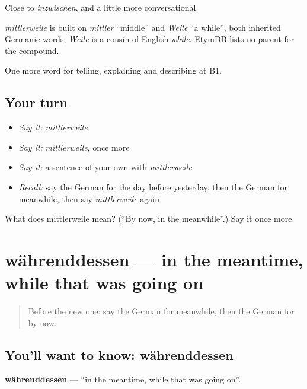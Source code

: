 Close to \emph{inzwischen}, and a little more conversational.

\begin{cousinweb}
\emph{mittlerweile} is built on \emph{mittler} \textquotedblleft{}middle\textquotedblright{} and \emph{Weile} \textquotedblleft{}a while\textquotedblright{}, both inherited Germanic words; \emph{Weile} is a cousin of English \emph{while}. EtymDB lists no parent for the compound.
\end{cousinweb}

\begin{grammarlens}[title={What you've built}]
One more word for telling, explaining and describing at B1.
\end{grammarlens}

\subsection*{Your turn}
\begin{itemize}
\raggedright
  \item \emph{Say it:} \emph{mittlerweile}
  \item \emph{Say it:} \emph{mittlerweile}, once more
  \item \emph{Say it:} a sentence of your own with \emph{mittlerweile}
  \item \emph{Recall:} say the German for the day before yesterday, then the German for meanwhile, then say \emph{mittlerweile} again
\end{itemize}

\begin{tcolorbox}[breakable,colback=teal!4,colframe=teal!35!black,title={Before you move on}]
What does mittlerweile mean? (\textquotedblleft{}By now, in the meanwhile\textquotedblright{}.) Say it once more.
\end{tcolorbox}
\section[währenddessen]{währenddessen — in the meantime, while that was going on}

\label{lesson:GE-C265-waehrenddessen}



\begin{quote}
Before the new one: say the German for meanwhile, then the German for by now.
\end{quote}

\subsection*{You'll want to know: währenddessen}
\textbf{währenddessen} — \textquotedblleft{}in the meantime, while that was going on\textquotedblright{}.

